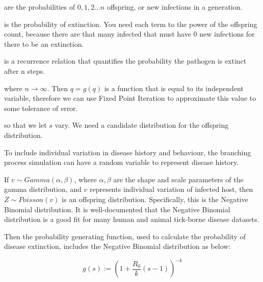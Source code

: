 \documentclass[twocolumn]{article}
\begin{document}
\begin{description}[leftmargin=1cm, style=nextline]
  \item[$ p_0, p_1, p_2 ... p_n $]
    are the probabilities of $ 0, 1, 2 ... n $ offspring, or new infections in a generation.
  \item[$ R_0 = p_0 0 + p_1 1 + p_2 2 + ... + p_i i = \sum_{i=0}^\infty i p_i $]
    
  \item[$ q = p_0 + p_1 q + p_2 q^2 + ... + p_\infty q^\infty $]
    is the probability of extinction. You need each term to the power of the offspring count, because there are that many infected that must have 0 new infections for there to be an extinction.
  \item[$ q_n = p_0 \sum_{i=1}^\infty p_i (q_{n-1})^i $]
    is a recurrence relation that quantifies the probability the pathogen is extinct after n steps.
  \item[$ q = p_0 \sum_{i=1}^\infty p_i q^i = g(q) $]
    where $ n \to \infty $. Then $ q=g(q) $ is a function that is equal to its independent variable, therefore we can use Fixed Point Iteration to approximate this value to some tolerance of error.
  \item[$ g(s) := p_0 \sum_{i=1}^\infty p_i s^i $]
    so that we let $ s $ vary. We need a candidate distribution for the offspring distribution.
\end{description}

To include individual variation in disease history and behaviour, the branching process simulation can have a random variable to represent disease history.

If $ v \sim Gamma(\alpha, \beta) $, where $ \alpha, \beta $ are the shape and scale parameters of the gamma distribution, and $ v $ represents individual variation of infected host, then $ Z \sim Poisson(v) $ is an offspring distribution. Specifically, this is the Negative Binomial distribution. It is well-documented that the Negative Binomial distribution is a good fit for many human and animal tick-borne disease datasets. 

Then the probability generating function, used to calculate the probability of disease extinction, includes the Negative Binomial distribution as below:

\begin{equation}
g(s) := \left(1 + \frac{R_0}{k}(s-1)\right)^{-k} \nonumber
\end{equation}

\section*{}
\end{document}

